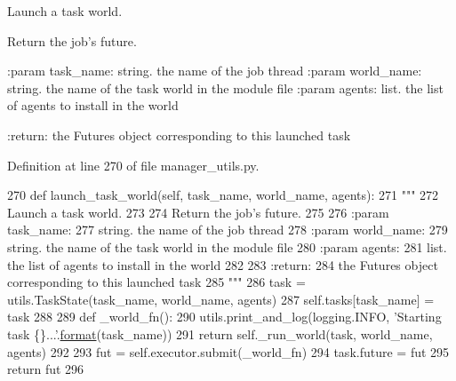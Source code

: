 \begin{DoxyVerb}Launch a task world.

Return the job's future.

:param task_name:
    string. the name of the job thread
:param world_name:
    string. the name of the task world in the module file
:param agents:
    list. the list of agents to install in the world

:return:
    the Futures object corresponding to this launched task
\end{DoxyVerb}
 

Definition at line 270 of file manager\+\_\+utils.\+py.


\begin{DoxyCode}
270     \textcolor{keyword}{def }launch\_task\_world(self, task\_name, world\_name, agents):
271         \textcolor{stringliteral}{"""}
272 \textcolor{stringliteral}{        Launch a task world.}
273 \textcolor{stringliteral}{}
274 \textcolor{stringliteral}{        Return the job's future.}
275 \textcolor{stringliteral}{}
276 \textcolor{stringliteral}{        :param task\_name:}
277 \textcolor{stringliteral}{            string. the name of the job thread}
278 \textcolor{stringliteral}{        :param world\_name:}
279 \textcolor{stringliteral}{            string. the name of the task world in the module file}
280 \textcolor{stringliteral}{        :param agents:}
281 \textcolor{stringliteral}{            list. the list of agents to install in the world}
282 \textcolor{stringliteral}{}
283 \textcolor{stringliteral}{        :return:}
284 \textcolor{stringliteral}{            the Futures object corresponding to this launched task}
285 \textcolor{stringliteral}{        """}
286         task = utils.TaskState(task\_name, world\_name, agents)
287         self.tasks[task\_name] = task
288 
289         \textcolor{keyword}{def }\_world\_fn():
290             utils.print\_and\_log(logging.INFO, \textcolor{stringliteral}{'Starting task \{\}...'}.\hyperlink{namespaceparlai_1_1chat__service_1_1services_1_1messenger_1_1shared__utils_a32e2e2022b824fbaf80c747160b52a76}{format}(task\_name))
291             \textcolor{keywordflow}{return} self.\_run\_world(task, world\_name, agents)
292 
293         fut = self.executor.submit(\_world\_fn)
294         task.future = fut
295         \textcolor{keywordflow}{return} fut
296 
\end{DoxyCode}
\mbox{\label{classparlai_1_1chat__service_1_1core_1_1manager__utils_1_1ChatServiceWorldRunner_a5bf689cb8ff9889da98990ad770fd9a3}} 
